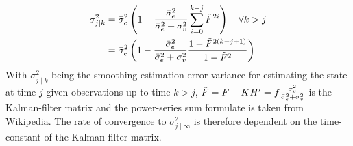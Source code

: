 \documentclass[oneside,12pt]{article}
\begin{document}
%
\begin{equation}\label{eq:sigma_smoothing_1d}
    \begin{split}
        \sigma_{j \mid k}^2 &= \Bar{\sigma}_e^2\left(1 - \frac{\Bar{\sigma}_e^2}{\Bar{\sigma}_e^2 + \sigma_v^2} \sum_{i=0}^{k-j} \tilde{F}^{2i}\right) \quad \forall{k>j}\\
        &= \Bar{\sigma}_e^2\left(1 - \frac{\Bar{\sigma}_e^2}{\Bar{\sigma}_e^2 + \sigma_v^2} \frac{1-\tilde{F}^{2(k-j+1)}}{1-\tilde{F}^{2}}\right)
    \end{split}
\end{equation}
%
With $\sigma_{j \mid k}^2$ being the smoothing estimation error variance for estimating the state at time $j$ given observations up to time $k>j$, $\tilde{F} = F - KH' = f \frac{\sigma_v^2}{\Bar{\sigma}_e^2 + \sigma_v^2}$ is the Kalman-filter matrix and the power-series sum formulate is taken from \href{https://en.wikipedia.org/wiki/Geometric_series#Formula}{Wikipedia}. The rate of convergence to $\sigma^2_{j \mid \infty}$ is therefore dependent on the time-constant of the Kalman-filter matrix.
%
\end{document}
